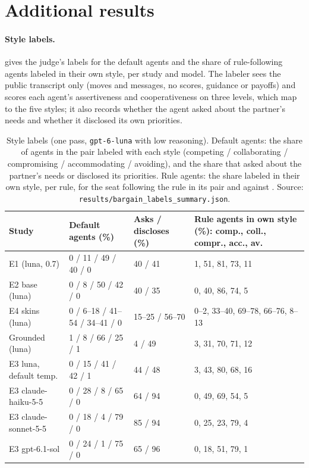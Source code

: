 \section{Additional results}
\label{app:more}

\paragraph{Style labels.}  gives the judge's labels for the default agents and the share of rule-following agents labeled in their own style, per study and model. The labeler sees the public transcript only (moves and messages, no scores, guidance or payoffs) and scores each agent's assertiveness and cooperativeness on three levels, which map to the five styles; it also records whether the agent asked about the partner's needs and whether it disclosed its own priorities.

\begin{table}[H]
\caption{Style labels (one pass, \texttt{gpt-6-luna} with low reasoning). Default agents: the share of agents in the \neutral{} pair labeled with each style (competing / collaborating / compromising / accommodating / avoiding), and the share that asked about the partner's needs or disclosed its priorities. Rule agents: the share labeled in their own style, per rule, for the seat following the rule in its pair and against \neutral. Source: \texttt{results/bargain\_labels\_summary.json}.}
\label{tab:labels}
\centering\scriptsize\setlength{\tabcolsep}{3pt}
\begin{tabular}{@{}l l l l@{}}
\toprule
Study & Default agents (\%) & Asks / discloses (\%) & Rule agents in own style (\%): comp., coll., compr., acc., av. \\
\midrule
E1 (luna, 0.7)            & 0 / 11 / 49 / 40 / 0 & 40 / 41 & 1, 51, 81, 73, 11 \\
E2 base (luna)            & 0 / 8 / 50 / 42 / 0  & 40 / 35 & 0, 40, 86, 74, 5 \\
E4 skins (luna)           & 0 / 6--18 / 41--54 / 34--41 / 0 & 15--25 / 56--70 & 0--2, 33--40, 69--78, 66--76, 8--13 \\
Grounded (luna)           & 1 / 8 / 66 / 25 / 1  & 4 / 49  & 3, 31, 70, 71, 12 \\
E3 luna, default temp.    & 0 / 15 / 41 / 42 / 1 & 44 / 48 & 3, 43, 80, 68, 16 \\
E3 claude-haiku-5-5       & 0 / 28 / 8 / 65 / 0  & 64 / 94 & 0, 49, 69, 54, 5 \\
E3 claude-sonnet-5-5      & 0 / 18 / 4 / 79 / 0  & 85 / 94 & 0, 25, 23, 79, 4 \\
E3 gpt-6.1-sol            & 0 / 24 / 1 / 75 / 0  & 65 / 96 & 0, 18, 51, 79, 1 \\
\bottomrule
\end{tabular}
\end{table}

